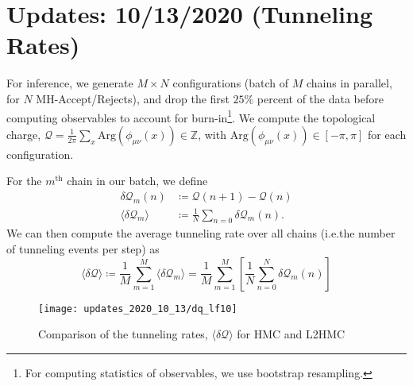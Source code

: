 %
\section{Updates: 10/13/2020 (Tunneling Rates)}%
\label{sec:updates_2020_10_13}
%
For inference, we generate \(M\times N\) configurations (batch of \(M\) chains in
parallel, for \(N\) MH-Accept/Rejects), and drop the first \(25\%\)
percent of the data before computing observables to account for
burn-in\footnote{For computing statistics of observables, we use bootstrap
resampling.}.
%
We compute the topological charge, \(\mathcal{Q} =
\frac{1}{2\pi}\sum_{x}\mathrm{Arg}\left(\phi_{\mu\nu}(x)\right) \in
\mathbb{Z}\), with \( \mathrm{Arg}\left(\phi_{\mu\nu}(x)\right) \in \left[-\pi,
\pi\right]\) for each configuration.
%

For the \(m^{\mathrm{th}}\) chain in our batch, we define 
%
\begin{align}
  \delta\mathcal{Q}_{m}(n) &\coloneqq \mathcal{Q}{(n+1)} - \mathcal{Q}{(n)}\\
  \langle\delta\mathcal{Q}_{m}\rangle &\coloneqq
  \frac{1}{N}\sum_{n=0}\delta\mathcal{Q}_{m}(n).
\end{align}
%
We can then compute the average tunneling rate over all chains (i.e.\@ the
number of tunneling events per step) as
%
\begin{equation}
  \langle \delta\mathcal{Q}\rangle%
  \coloneqq \frac{1}{M}\sum_{m=1}^{M}\langle\delta\mathcal{Q}_{m}\rangle
  =\frac{1}{M}\sum_{m=1}^{M}\left[\frac{1}{N}\sum_{n=0}^{N} \delta\mathcal{Q}_{m}(n)\right]
\end{equation}
%

\begin{figure}[htpb]
  \centering
  \texttt{[image: updates\_2020\_10\_13/dq\_lf10]}
  \caption{Comparison of the tunneling rates,
  \(\langle\delta\mathcal{Q}\rangle\) for HMC and L2HMC}
\end{figure}

